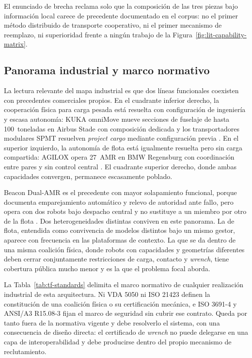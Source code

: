 El enunciado de brecha reclama solo que la composición de las tres piezas bajo
información local carece de precedente documentado en el corpus: no el primer
método distribuido de transporte cooperativo, ni el primer mecanismo de
reemplazo, ni superioridad frente a ningún trabajo de la
Figura~\ref{fig:lit-capability-matrix}.

\subsection{Panorama industrial y marco normativo}
\label{app:review-industrial-full}

La lectura relevante del mapa industrial es que dos líneas funcionales
coexisten con precedentes comerciales propios. En el cuadrante inferior
derecho, la cooperación física para carga pesada está resuelta con
configuración de ingeniería y escasa autonomía: KUKA omniMove mueve secciones
de fuselaje de hasta 100~toneladas en Airbus Stade con composición dedicada
\parencite{kukaOmnimoveAirbus2016} y los transportadores modulares SPMT
resuelven \emph{project cargo} mediante configuración previa
\parencite{tiiScheuerleSpmt2023}. En el superior izquierdo, la autonomía de
flota está igualmente resuelta pero sin carga compartida: AGILOX opera
27~AMR en BMW Regensburg con coordinación entre pares y sin control central
\parencite{agiloxXswarmBmw2023}. El cuadrante superior derecho, donde ambas
capacidades convergen, permanece escasamente poblado.

Beacon Dual-AMR es el precedente con mayor solapamiento funcional, porque
documenta emparejamiento automático y relevo de autoridad ante fallo, pero
opera con dos robots bajo despacho central y no sustituye a un miembro por
otro de la flota \parencite{beaconDualAmr2026}. Dos heterogeneidades distintas
conviven en este panorama. La de flota, entendida como convivencia de modelos
distintos bajo un mismo gestor, aparece con frecuencia en las plataformas de
contexto. La que se da dentro de una misma coalición física, donde robots con
capacidades y geometrías diferentes deben cerrar conjuntamente restricciones
de carga, contacto y \emph{wrench}, tiene cobertura pública mucho menor y es
la que el problema focal aborda.



La Tabla~\ref{tab:tf-standards} delimita el marco normativo de cualquier
realización industrial de esta arquitectura. Ni VDA 5050 ni ISO 21423 definen
la constitución de una coalición física o su certificación mecánica, e ISO
3691-4 y ANSI/A3 R15.08-3 fijan el marco de seguridad sin cubrir ese contrato.
Queda por tanto fuera de la normativa vigente y debe resolverlo el sistema,
con una consecuencia de diseño directa: el certificado de \emph{wrench} no
puede delegarse en una capa de interoperabilidad y debe producirse dentro del
propio mecanismo de reclutamiento.

